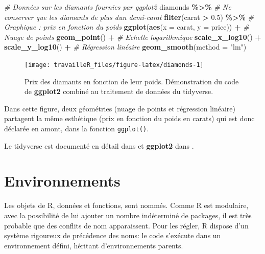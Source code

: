 \documentclass[
  12pt,
  french,
  a4paper,
  extrafontsizes,onecolumn,openright
  ]{memoir}
\newenvironment{Shaded}{\begin{snugshade}}{\end{snugshade}}
\newcommand{\AttributeTok}[1]{\textcolor[rgb]{0.13,0.29,0.53}{#1}}
\newcommand{\CommentTok}[1]{\textcolor[rgb]{0.56,0.35,0.01}{\textit{#1}}}
\newcommand{\FloatTok}[1]{\textcolor[rgb]{0.00,0.00,0.81}{#1}}
\newcommand{\FunctionTok}[1]{\textcolor[rgb]{0.13,0.29,0.53}{\textbf{#1}}}
\newcommand{\NormalTok}[1]{#1}
\newcommand{\SpecialCharTok}[1]{\textcolor[rgb]{0.81,0.36,0.00}{\textbf{#1}}}
\newcommand{\StringTok}[1]{\textcolor[rgb]{0.31,0.60,0.02}{#1}}
\begin{document}
\begin{Shaded}
\begin{Highlighting}[]
\CommentTok{\# Données sur les diamants fournies par ggplot2}
\NormalTok{diamonds }\SpecialCharTok{\%\textgreater{}\%} 
  \CommentTok{\# Ne conserver que les diamants de plus d\textquotesingle{}un demi{-}carat}
  \FunctionTok{filter}\NormalTok{(carat }\SpecialCharTok{\textgreater{}} \FloatTok{0.5}\NormalTok{) }\SpecialCharTok{\%\textgreater{}\%} 
  \CommentTok{\# Graphique : prix en fonction du poids}
  \FunctionTok{ggplot}\NormalTok{(}\FunctionTok{aes}\NormalTok{(}\AttributeTok{x =}\NormalTok{ carat, }\AttributeTok{y =}\NormalTok{ price)) }\SpecialCharTok{+}
    \CommentTok{\# Nuage de points}
    \FunctionTok{geom\_point}\NormalTok{() }\SpecialCharTok{+} 
    \CommentTok{\# Echelle logarithmique}
    \FunctionTok{scale\_x\_log10}\NormalTok{() }\SpecialCharTok{+} 
    \FunctionTok{scale\_y\_log10}\NormalTok{() }\SpecialCharTok{+} 
    \CommentTok{\# Régression linéaire}
    \FunctionTok{geom\_smooth}\NormalTok{(}\AttributeTok{method =} \StringTok{"lm"}\NormalTok{)}
\end{Highlighting}
\end{Shaded}

\begin{figure}

{\centering \texttt{[image: travailleR\_files/figure-latex/diamonds-1]} 

}

\caption{Prix des diamants en fonction de leur poids. Démonstration du code de \textbf{ggplot2} combiné au traitement de données du tidyverse.}\label{fig:diamonds}
\end{figure}

\normalsize

Dans cette figure, deux géométries (nuage de points et régression linéaire) partagent la même esthétique (prix en fonction du poids en carats) qui est donc déclarée en amont, dans la fonction \texttt{ggplot()}.

Le tidyverse est documenté en détail dans \textcite{Wickham2016} et \textbf{ggplot2} dans \textcite{Wickham2017}.

\section{Environnements}\label{sec:environnements}

Les objets de R, données et fonctions, sont nommés.
Comme R est modulaire, avec la possibilité de lui ajouter un nombre indéterminé de packages, il est très probable que des conflits de nom apparaissent.
Pour les régler, R dispose d'un système rigoureux de précédence des noms: le code s'exécute dans un environnement défini, héritant d'environnements parents.
\end{document}
